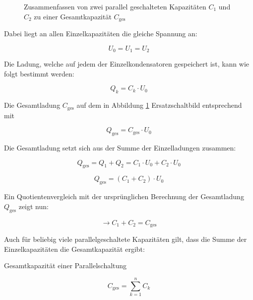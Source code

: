 \begin{frame}
{\begin{figure}[h!]
\begin{center}
		\end{center}
		\label{fig:parallelkondensator}
		\caption{Zusammenfassen von zwei parallel geschalteten Kapazitäten $C_1$ und $C_2$ zu einer Gesamtkapazität $C_\mathrm{ges}$}	
	\end{figure}

	Dabei liegt an allen Einzelkapazitäten die gleiche Spannung an:

	\begin{equation*}
		U_0 = U_1 = U_2
	\end{equation*}

	Die Ladung, welche auf jedem der Einzelkondensatoren gespeichert ist, kann wie folgt bestimmt werden:

	\begin{equation*}
		Q_k = C_k \cdot U_0
	\end{equation*}

	Die Gesamtladung $C_\mathrm{ges}$ auf dem in Abbildung \ref{fig:parallelkondensator} Ersatzschaltbild entsprechend mit

	\begin{equation*}
		Q_\mathrm{ges} = C_\mathrm{ges} \cdot U_0
	\end{equation*}

	Die Gesamtladung setzt sich aus der Summe der Einzelladungen zusammen:


	\begin{equation*}
		Q_\mathrm{ges} = Q_1 + Q_2 = C_1 \cdot U_0 + C_2 \cdot U_0 
	\end{equation*}

	
	
	\begin{equation*}
		Q_\mathrm{ges} =  (C_1 + C_2) \cdot U_0 
	\end{equation*}

	Ein Quotientenvergleich mit der ursprünglichen Berechnung der Gesamtladung $Q_\mathrm{ges}$ zeigt nun:


	
	\begin{equation*}
		\rightarrow C_1 + C_2 = C_\mathrm{ges}
	\end{equation*}

	Auch für beliebig viele parallelgeschaltete Kapazitäten gilt, dass die Summe der Einzelkapazitäten die Gesamtkapazität ergibt:

	
	\begin{Merksatz}{Gesamtkapazität einer Parallelschaltung}

		\begin{equation*}
			C_\mathrm{ges} = \sum_{k=1}^{n} C_k 
		\end{equation*}
			

\end{Merksatz}}
\end{frame}
